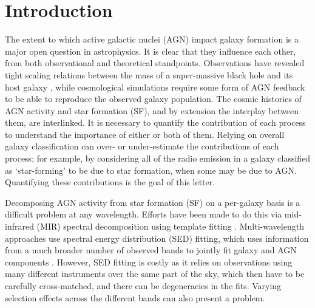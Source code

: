 \documentclass[usenatbib,fleqn,letters]{mnras}
\begin{document}
\section{Introduction}
\label{sec:intro}
The extent to which active galactic nuclei (AGN) impact galaxy formation is a major open question in astrophysics. It is clear that they influence each other, from both observational and theoretical standpoints. Observations have revealed tight scaling relations between the mass of a super-massive black hole and its host galaxy \citep[see, e.g.][and references therein]{kormendy_coevolution_2013}, while cosmological simulations require some form of AGN feedback \citep{bower_breaking_2006,croton_many_2006} to be able to reproduce the observed galaxy population. 
The cosmic histories of AGN activity and star formation (SF), and by extension the interplay between them, are interlinked. It is necessary to quantify the contribution of each process to understand the importance of either or both of them. Relying on overall galaxy classification can over- or under-estimate the contributions of each process; for example, by considering all of the radio emission in a galaxy classified as `star-forming' to be due to star formation, when some may be due to AGN. Quantifying these contributions is the goal of this letter. 

Decomposing AGN activity from star formation (SF) on a per-galaxy basis is a difficult problem at any wavelength. Efforts have been made to do this via mid-infrared (MIR) spectral decomposition using template fitting \citep[e.g.,][]{laurent_mid-infrared_2000,hernan-caballero_resolving_2015,li_active_2024}. Multi-wavelength approaches use spectral energy distribution (SED) fitting, which uses information from a much broader number of observed bands to jointly fit galaxy and AGN components \citep[e.g.][]{calistro_rivera_agnfitter_2016,boquien_cigale_2019,pacifici_art_2023}. However, SED fitting is costly as it relies on observations using many different instruments over the same part of the sky, which then have to be carefully cross-matched, and there can be degeneracies in the fits. Varying selection effects across the different bands can also present a problem. 
\end{document}
